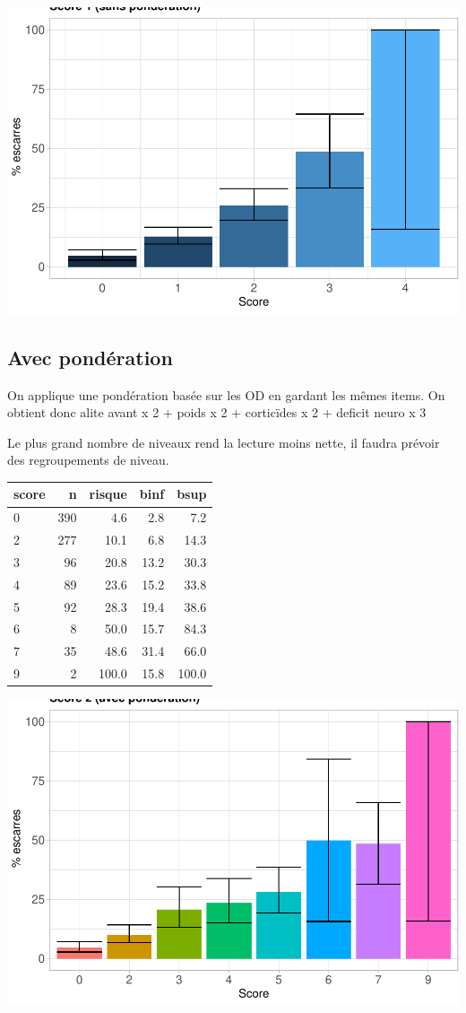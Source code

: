 \documentclass[]{article}
\begin{document}
\includegraphics{book_escarre_files/figure-latex/unnamed-chunk-2-1.pdf}

\hypertarget{avec-ponderation}{%
\subsection{Avec pondération}\label{avec-ponderation}}

On applique une pondération basée sur les OD en gardant les mêmes items.
On obtient donc alite avant x 2 + poids x 2 + corticïdes x 2 + deficit
neuro x 3

Le plus grand nombre de niveaux rend la lecture moins nette, il faudra
prévoir des regroupements de niveau.

\begin{longtable}[]{@{}lrrrr@{}}
\toprule
score & n & risque & binf & bsup\tabularnewline
\midrule
\endhead
0 & 390 & 4.6 & 2.8 & 7.2\tabularnewline
2 & 277 & 10.1 & 6.8 & 14.3\tabularnewline
3 & 96 & 20.8 & 13.2 & 30.3\tabularnewline
4 & 89 & 23.6 & 15.2 & 33.8\tabularnewline
5 & 92 & 28.3 & 19.4 & 38.6\tabularnewline
6 & 8 & 50.0 & 15.7 & 84.3\tabularnewline
7 & 35 & 48.6 & 31.4 & 66.0\tabularnewline
9 & 2 & 100.0 & 15.8 & 100.0\tabularnewline
\bottomrule
\end{longtable}

\includegraphics{book_escarre_files/figure-latex/sc2-1.pdf}
\end{document}
